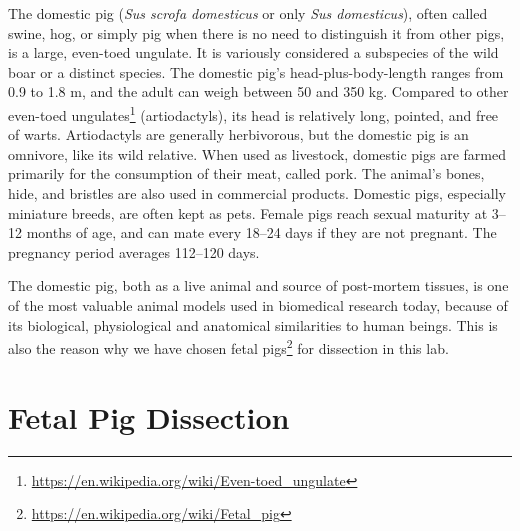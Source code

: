 \documentclass[]{book}
\let\rmarkdownfootnote\footnote%
\def\footnote{\protect\rmarkdownfootnote}
\renewcommand{\href}[2]{#2\footnote{\url{#1}}}
\theoremstyle{definition}
\theoremstyle{definition}
\theoremstyle{definition}
\theoremstyle{remark}
\let\BeginKnitrBlock\begin \let\EndKnitrBlock\end
\begin{document}
The domestic pig (\emph{Sus scrofa domesticus} or only \emph{Sus
domesticus}), often called swine, hog, or simply pig when there is no
need to distinguish it from other pigs, is a large, even-toed ungulate.
It is variously considered a subspecies of the wild boar or a distinct
species. The domestic pig's head-plus-body-length ranges from 0.9 to 1.8
m, and the adult can weigh between 50 and 350 kg. Compared to other
\href{https://en.wikipedia.org/wiki/Even-toed_ungulate}{even-toed
ungulates} (artiodactyls), its head is relatively long, pointed, and
free of warts. Artiodactyls are generally herbivorous, but the domestic
pig is an omnivore, like its wild relative. When used as livestock,
domestic pigs are farmed primarily for the consumption of their meat,
called pork. The animal's bones, hide, and bristles are also used in
commercial products. Domestic pigs, especially miniature breeds, are
often kept as pets. Female pigs reach sexual maturity at 3--12 months of
age, and can mate every 18--24 days if they are not pregnant. The
pregnancy period averages 112--120 days.

\BeginKnitrBlock{rmdnote}
The domestic pig, both as a live animal and source of post-mortem
tissues, is one of the most valuable animal models used in biomedical
research today, because of its biological, physiological and anatomical
similarities to human beings. This is also the reason why we have chosen
\href{https://en.wikipedia.org/wiki/Fetal_pig}{fetal pigs} for
dissection in this lab.
\EndKnitrBlock{rmdnote}

\section{Fetal Pig Dissection}\label{fetal-pig-dissection}
\end{document}
